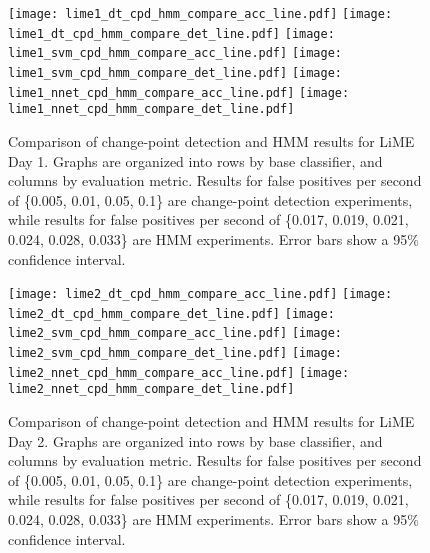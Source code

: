 \begin{figure}[h]
 \centering
 \texttt{[image: lime1\_dt\_cpd\_hmm\_compare\_acc\_line.pdf]} \hspace{1em}\vspace{1em}
 \texttt{[image: lime1\_dt\_cpd\_hmm\_compare\_det\_line.pdf]} 
 \texttt{[image: lime1\_svm\_cpd\_hmm\_compare\_acc\_line.pdf]} \hspace{1em}\vspace{1em}
 \texttt{[image: lime1\_svm\_cpd\_hmm\_compare\_det\_line.pdf]}
 \texttt{[image: lime1\_nnet\_cpd\_hmm\_compare\_acc\_line.pdf]} \hspace{1em}
 \texttt{[image: lime1\_nnet\_cpd\_hmm\_compare\_det\_line.pdf]}
 \caption{Comparison of change-point detection and HMM results for LiME Day 1.
  Graphs are organized into rows by base classifier, and columns by evaluation
  metric. Results for false positives per second of \{0.005, 0.01, 0.05, 0.1\} are change-point
  detection experiments, while results for false positives per second of
  \{0.017, 0.019, 0.021, 0.024, 0.028, 0.033\} are HMM experiments. Error bars
  show a 95\% confidence interval.}
 \label{fig:lime1_compare_cpd_hmm}
\end{figure}

\begin{figure}[h]
 \centering
 \texttt{[image: lime2\_dt\_cpd\_hmm\_compare\_acc\_line.pdf]} \hspace{1em}\vspace{1em}
 \texttt{[image: lime2\_dt\_cpd\_hmm\_compare\_det\_line.pdf]} 
 \texttt{[image: lime2\_svm\_cpd\_hmm\_compare\_acc\_line.pdf]} \hspace{1em}\vspace{1em}
 \texttt{[image: lime2\_svm\_cpd\_hmm\_compare\_det\_line.pdf]}
 \texttt{[image: lime2\_nnet\_cpd\_hmm\_compare\_acc\_line.pdf]} \hspace{1em}
 \texttt{[image: lime2\_nnet\_cpd\_hmm\_compare\_det\_line.pdf]}
 \caption{Comparison of change-point detection and HMM results for LiME Day 2.
  Graphs are organized into rows by base classifier, and columns by evaluation
  metric. Results for false positives per second of \{0.005, 0.01, 0.05, 0.1\} are change-point
  detection experiments, while results for false positives per second of
  \{0.017, 0.019, 0.021, 0.024, 0.028, 0.033\} are HMM experiments. Error bars
  show a 95\% confidence interval.}
 \label{fig:lime2_compare_cpd_hmm}
\end{figure}

